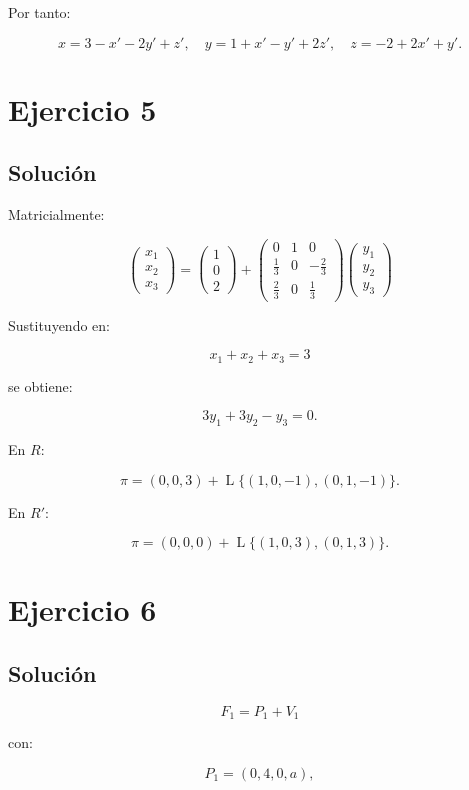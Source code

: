 \documentclass[11pt,a4paper]{article}
\newcommand{\Span}{\operatorname{L}}
\begin{document}
Por tanto:

\[
\boxed{
x=3-x'-2y'+z',
\quad
y=1+x'-y'+2z',
\quad
z=-2+2x'+y'.
}
\]

\section{Ejercicio 5}
\subsection{Solución}

Matricialmente:

\[
\boxed{
\begin{pmatrix}
x_1\\x_2\\x_3
\end{pmatrix}
=
\begin{pmatrix}
1\\0\\2
\end{pmatrix}
+
\begin{pmatrix}
0&1&0\\
\frac13&0&-\frac23\\
\frac23&0&\frac13
\end{pmatrix}
\begin{pmatrix}
y_1\\y_2\\y_3
\end{pmatrix}
}
\]

Sustituyendo en:

\[
x_1+x_2+x_3=3
\]

se obtiene:

\[
\boxed{
3y_1+3y_2-y_3=0.
}
\]

En $R$:

\[
\boxed{
\pi=
(0,0,3)
+
\Span\{(1,0,-1),(0,1,-1)\}.
}
\]

En $R'$:

\[
\boxed{
\pi=
(0,0,0)
+
\Span\{(1,0,3),(0,1,3)\}.
}
\]

\section{Ejercicio 6}
\subsection{Solución}

\[
F_1=P_1+V_1
\]

con:

\[
P_1=(0,4,0,a),
\]
\end{document}
